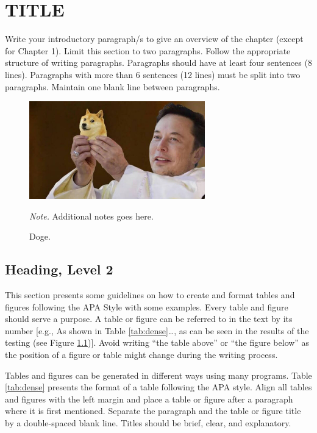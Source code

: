 \setlength{\footskip}{8mm}

\chapter{TITLE}

Write your introductory paragraph/s to give an overview of the chapter (except for Chapter 1). Limit this section to two paragraphs. Follow the appropriate structure of writing paragraphs. Paragraphs should have at least four sentences (8 lines). Paragraphs with more than 6 sentences (12 lines) must be split into two paragraphs.  Maintain one blank line between paragraphs.

\begin{figure}
\caption{Doge.}
\centerline{\includegraphics[width=3in]{figures/doge.jpeg}}
\label{fig:doge}
\small{\textit{Note.} Additional notes goes here.}
\end{figure}

\section{Heading, Level 2}

This section presents some guidelines on how to create and format tables and figures following the APA Style with some examples. Every table and figure should serve a purpose. A table or figure can be referred to in the text by its number [e.g., As shown in Table \ref{tab:dense}…, as can be seen in the results of the testing (see Figure \ref{fig:doge})].  Avoid writing “the table above” or “the figure below” as the position of a figure or table might change during the writing process.

Tables and figures can be generated in different ways using many programs.  Table \ref{tab:dense} presents the format of a table following the APA style. Align all tables and figures with the left margin and place a table or figure after a paragraph where it is first mentioned. Separate the paragraph and the table or figure title by a double-spaced blank line. Titles should be brief, clear, and explanatory. 

